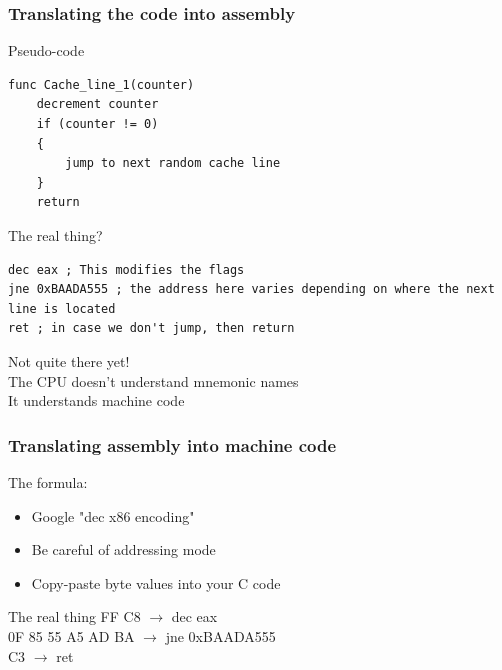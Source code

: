 \documentclass{beamer}
\begin{document}
\begin{frame}[fragile]
\frametitle{Translating the code into assembly}
\begin{block}{Pseudo-code}
\begin{lstlisting}[style=code]
func Cache_line_1(counter)
    decrement counter
    if (counter != 0)
    {
        jump to next random cache line
    }
    return
\end{lstlisting}
\end{block}
\begin{block}{The real thing?}
\begin{lstlisting}[style=code]
dec eax ; This modifies the flags
jne 0xBAADA555 ; the address here varies depending on where the next line is located
ret ; in case we don't jump, then return
\end{lstlisting}
\end{block}
Not quite there yet!\\
The CPU doesn't understand mnemonic names\\
It understands machine code
\end{frame}

\begin{frame}[fragile]
\frametitle{Translating assembly into machine code}
The formula:\\
\begin{itemize}
\item Google "dec x86 encoding"
\item Be careful of addressing mode
\item Copy-paste byte values into your C code
\end{itemize}
\begin{block}{The real thing}
FF C8 $\rightarrow$ dec eax\\
0F 85 55 A5 AD BA $\rightarrow$ jne 0xBAADA555\\
C3 $\rightarrow$ ret
\end{block}
\end{frame}
\end{document}
